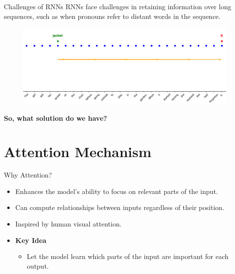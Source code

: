 \documentclass[serif, aspectratio=169]{beamer}
\begin{document}
\begin{frame}{Challenges of RNNs}
		RNNs face challenges in retaining information over long sequences, such as when pronouns refer to distant words in the sequence.
		\begin{figure}
			\centering
			\includegraphics[width=0.99\textwidth]{pic/RNN-challenges.png}
			\label{fig:RNN-challenges}
		\end{figure}
		\textbf{So, what solution do we have?}
\end{frame}

\section{Attention Mechanism}

\begin{frame}{Why Attention?}
	\begin{itemize}
		\item Enhances the model's ability to focus on relevant parts of the input.
		\item Can compute relationships between inputs regardless of their position.
		\item Inspired by human visual attention.
		\item \textbf{Key Idea}
		\begin{itemize}
			\item Let the model learn which parts of the input are important for each output.
		\end{itemize}
	\end{itemize}
\end{frame}
\end{document}
